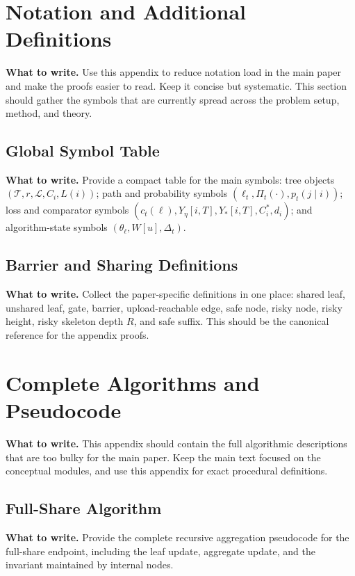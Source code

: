 \documentclass{article}
\newcommand{\towrite}[1]{\noindent\textbf{What to write.} #1}
\begin{document}
\section{Notation and Additional Definitions}

\towrite{Use this appendix to reduce notation load in the main paper and make the proofs easier to read. Keep it concise but systematic. This section should gather the symbols that are currently spread across the problem setup, method, and theory.}

\subsection{Global Symbol Table}

\towrite{Provide a compact table for the main symbols: tree objects $(\mathcal{T}, r, \mathcal{L}, C_i, L(i))$; path and probability symbols $(\ell_t, \Pi_t(\cdot), p_t(j \mid i))$; loss and comparator symbols $(c_t(\ell), Y_\eta[i,T], Y_\ast[i,T], C_i^\ast, d_i)$; and algorithm-state symbols $(\theta_\ell, W[u], \Delta_t)$.}

\subsection{Barrier and Sharing Definitions}

\towrite{Collect the paper-specific definitions in one place: shared leaf, unshared leaf, gate, barrier, upload-reachable edge, safe node, risky node, risky height, risky skeleton depth $R$, and safe suffix. This should be the canonical reference for the appendix proofs.}

\section{Complete Algorithms and Pseudocode}

\towrite{This appendix should contain the full algorithmic descriptions that are too bulky for the main paper. Keep the main text focused on the conceptual modules, and use this appendix for exact procedural definitions.}

\subsection{Full-Share Algorithm}

\towrite{Provide the complete recursive aggregation pseudocode for the full-share endpoint, including the leaf update, aggregate update, and the invariant maintained by internal nodes.}
\end{document}
